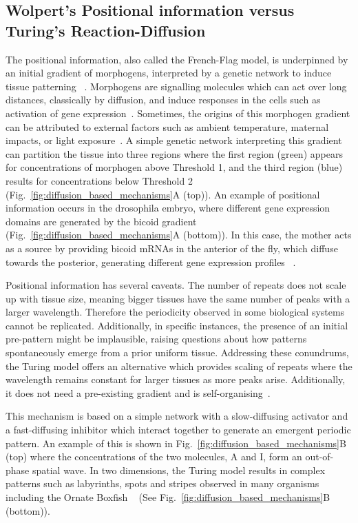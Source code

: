 \subsection{Wolpert's Positional information versus Turing's Reaction-Diffusion}
The positional information, also called the French-Flag model, is underpinned by an initial gradient of morphogens, interpreted by a genetic network to induce tissue patterning ~\parencite{Wolpert1969}.
Morphogens are signalling molecules which can act over long distances, classically by diffusion, and induce responses in the cells such as activation of gene expression~\parencite{rogers2011morphogen}.
Sometimes, the origins of this morphogen gradient can be attributed to external factors such as ambient temperature, maternal impacts, or light exposure~\parencite{Schier2009}.
A simple genetic network interpreting this gradient can partition the tissue into three regions where the first region (green) appears for concentrations of morphogen above Threshold 1, and the third region (blue) results for concentrations below Threshold 2 (Fig.~\ref{fig:diffusion_based_mechanisms}A (top)).
An example of positional information occurs in the drosophila embryo, where different gene expression domains are generated by the bicoid gradient (Fig.~\ref{fig:diffusion_based_mechanisms}A (bottom)).
In this case, the mother acts as a source by providing bicoid mRNAs in the anterior of the fly, which diffuse towards the posterior, generating different gene expression profiles ~\parencite{grimm2010modelling}.

Positional information has several caveats.
The number of repeats does not scale up with tissue size, meaning bigger tissues have the same number of peaks with a larger wavelength.
Therefore the periodicity observed in some biological systems cannot be replicated.
Additionally, in specific instances, the presence of an initial pre-pattern might be implausible, raising questions about how patterns spontaneously emerge from a prior uniform tissue.
Addressing these conundrums, the Turing model offers an alternative which provides scaling of repeats where the wavelength remains constant for larger tissues as more peaks arise.
Additionally, it does not need a pre-existing gradient and is self-organising~\parencite{Turing1952, Kondo2010a}.

This mechanism is based on a simple network with a slow-diffusing activator and a fast-diffusing inhibitor which interact together to generate an emergent periodic pattern.
An example of this is shown in Fig.~\ref{fig:diffusion_based_mechanisms}B (top) where the concentrations of the two molecules, A and I, form an out-of-phase spatial wave.
In two dimensions, the Turing model results in complex patterns such as labyrinths, spots and stripes observed in many organisms including the Ornate Boxfish ~\parencite{Alessio2023} (See Fig.~\ref{fig:diffusion_based_mechanisms}B (bottom)).

